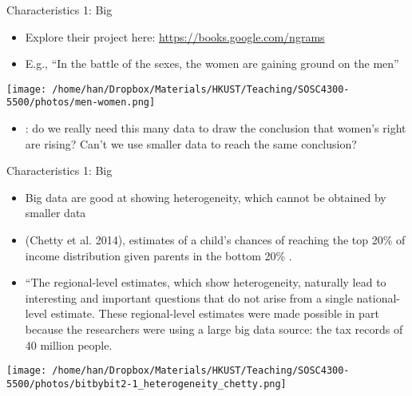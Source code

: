 \documentclass[handout]{beamer}
\begin{document}
\begin{frame}[label={h:7bfb9ba9-36a4-40cb-baa2-b8e81e499d21}]{Characteristics 1: Big}
\begin{itemize}
\item Explore their project here: \url{https://books.google.com/ngrams}
\item E.g., ``In the battle of the sexes, the women are gaining ground on the men''
\end{itemize}
\begin{center}
\texttt{[image: /home/han/Dropbox/Materials/HKUST/Teaching/SOSC4300-5500/photos/men-women.png]}
\end{center}
\begin{itemize}
\item{}: do we really need this many data to draw the conclusion that women's right are rising? Can't we use smaller data to reach the same conclusion?
\end{itemize}
\end{frame}

\begin{frame}[label={h:85a72ae8-ba2b-4ec2-9756-53413590c23a}]{Characteristics 1: Big}
\begin{itemize}
\item Big data are good at showing heterogeneity, which cannot be obtained by smaller data
\item (Chetty et al. 2014), estimates of a child’s chances of reaching the top 20\% of income distribution given parents in the bottom 20\% .
\item ``The regional-level estimates, which show heterogeneity, naturally lead to interesting and important questions that do not arise from a single national-level estimate. These regional-level estimates were made possible in part because the researchers were using a large big data source: the tax records of 40 million people.
\end{itemize}


\begin{center}
\texttt{[image: /home/han/Dropbox/Materials/HKUST/Teaching/SOSC4300-5500/photos/bitbybit2-1\_heterogeneity\_chetty.png]}
\end{center}
\end{frame}
\end{document}
